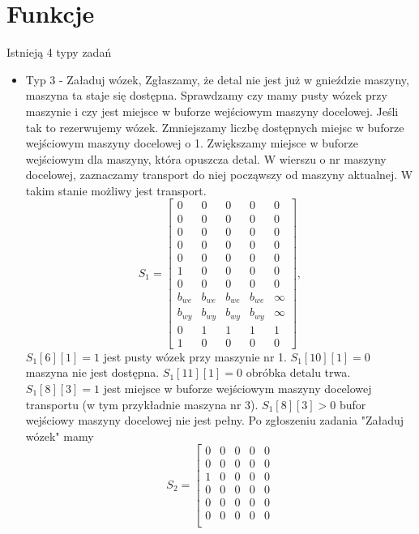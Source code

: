 \documentclass[10pt, a4paper]{article}
\begin{document}
\section{Funkcje}
\label{funkcje}
Istnieją 4 typy zadań
\begin{itemize}

\item Typ 3 - Załaduj wózek,
Zgłaszamy, że detal nie jest już w gnieździe maszyny, maszyna ta staje się dostępna. Sprawdzamy czy mamy pusty wózek przy maszynie i czy jest miejsce w buforze wejściowym maszyny docelowej. Jeśli tak to rezerwujemy wózek. Zmniejszamy liczbę dostępnych miejsc w buforze wejściowym maszyny docelowej o 1. Zwiększamy miejsce w buforze wejściowym dla maszyny, która opuszcza detal. W wierszu o nr maszyny docelowej, zaznaczamy transport do niej począwszy od maszyny aktualnej. W takim stanie możliwy jest transport.
\begin{equation}
S_1=\left[\begin{array}{ccccc}
0 & 0 & 0 & 0&0\\
0 & 0 & 0 & 0 & 0\\
0 & 0 & 0 & 0& 0\\
0 & 0 & 0 & 0& 0\\
0 & 0 & 0 & 0& 0\\
1 & 0 & 0 & 0 & 0\\
0 & 0 & 0 & 0& 0\\
b_{we}& b_{we}& b_{we}& b_{we} & \infty\\
b_{wy}& b_{wy}& b_{wy}& b_{wy} & \infty\\
0& 1& 1& 1 & 1\\
1 & 0 & 0 & 0 & 0
\end{array}\right],
\end{equation}
$S_1[6][1]=1$ jest pusty wózek przy maszynie nr 1. $S_1[10][1]=0$ maszyna nie jest dostępna. $S_1[11][1]=0$ obróbka detalu trwa. $S_1[8][3]=1$ jest miejsce w buforze wejściowym maszyny docelowej transportu (w tym przykładnie maszyna nr 3). $S_1[8][3]>0$ bufor wejściowy maszyny docelowej nie jest pełny. Po zgłoszeniu zadania "Załaduj wózek" mamy
\begin{equation}
S_2=\left[\begin{array}{ccccc}
0 & 0 & 0 & 0&0\\
0 & 0 & 0 & 0 & 0\\
1 & 0 & 0 & 0& 0\\
0 & 0 & 0 & 0& 0\\
0 & 0 & 0 & 0& 0\\
0 & 0 & 0 & 0 & 0\\

\end{array}
\end{equation}
\end{itemize}
\end{document}
